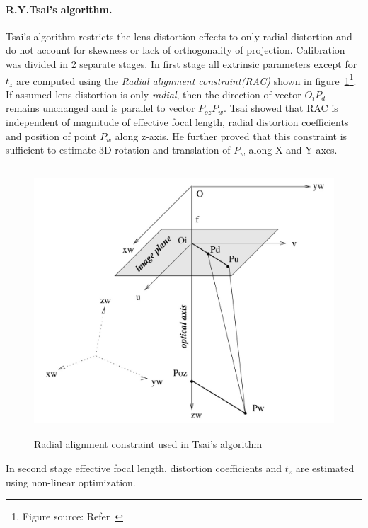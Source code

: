 \paragraph{R.Y.Tsai's algorithm.}  
Tsai's algorithm restricts the lens-distortion effects to only radial distortion and do not account for skewness or lack of orthogonality of projection. Calibration was divided in 2 separate stages. In first stage all extrinsic parameters except for $t_z$ are computed using the \textit{Radial alignment constraint(RAC)} shown in figure~\ref{fig:rac}\footnote{Figure source: Refer~\cite{16}}. If assumed lens distortion is only \textit{radial}, then the direction of vector $O_iP_d$ remains unchanged and is parallel to vector $P_{oz}P_w$. Tsai showed that RAC is independent of magnitude of effective focal length, radial distortion coefficients and position of point $P_w$ along z-axis. He further proved that this constraint is sufficient to estimate 3D rotation and translation of $P_w$ along X and Y axes. \newline   
\begin{figure}[ht]  
\centering  
\includegraphics[width=13cm,height=10cm]{../img_source/tsai_rac.jpg}  
\caption{Radial alignment constraint used in Tsai's algorithm}  
\label{fig:rac}
\end{figure}  
  
\noindent  
In second stage effective focal length, distortion coefficients and $t_z$ are estimated using non-linear optimization.  
  
  
